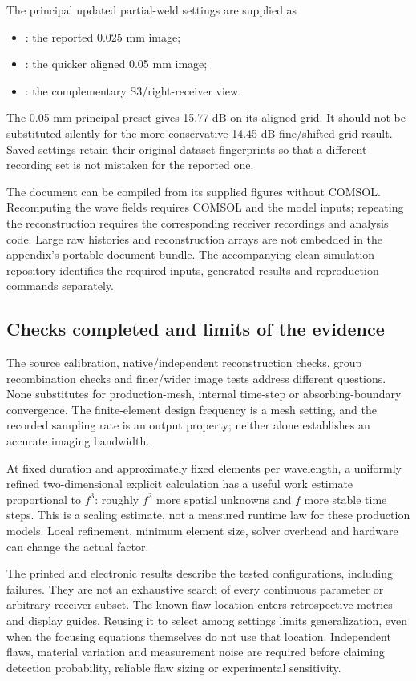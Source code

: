 The principal updated partial-weld settings are supplied as
\begin{itemize}\raggedright
\item {}: the reported 0.025 mm image;
\item {}: the quicker aligned 0.05 mm image;
\item {}: the complementary S3/right-receiver view.
\end{itemize}
The 0.05 mm principal preset gives 15.77 dB on its aligned grid. It should not be substituted silently for the more conservative 14.45 dB fine/shifted-grid result. Saved settings retain their original dataset fingerprints so that a different recording set is not mistaken for the reported one.

The document can be compiled from its supplied figures without COMSOL. Recomputing the wave fields requires COMSOL and the model inputs; repeating the reconstruction requires the corresponding receiver recordings and analysis code. Large raw histories and reconstruction arrays are not embedded in the appendix's portable document bundle. The accompanying clean simulation repository identifies the required inputs, generated results and reproduction commands separately.

\subsection{Checks completed and limits of the evidence}
The source calibration, native/independent reconstruction checks, group recombination checks and finer/wider image tests address different questions. None substitutes for production-mesh, internal time-step or absorbing-boundary convergence. The finite-element design frequency is a mesh setting, and the recorded sampling rate is an output property; neither alone establishes an accurate imaging bandwidth.

At fixed duration and approximately fixed elements per wavelength, a uniformly refined two-dimensional explicit calculation has a useful work estimate proportional to $f^3$: roughly $f^2$ more spatial unknowns and $f$ more stable time steps. This is a scaling estimate, not a measured runtime law for these production models. Local refinement, minimum element size, solver overhead and hardware can change the actual factor.

The printed and electronic results describe the tested configurations, including failures. They are not an exhaustive search of every continuous parameter or arbitrary receiver subset. The known flaw location enters retrospective metrics and display guides. Reusing it to select among settings limits generalization, even when the focusing equations themselves do not use that location. Independent flaws, material variation and measurement noise are required before claiming detection probability, reliable flaw sizing or experimental sensitivity.

\FloatBarrier
\endgroup
